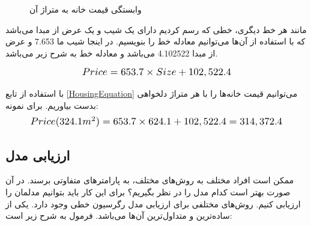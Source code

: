 \documentclass[a4paper, titlepage]{article}
\begin{document}
\begin{figure}[!htp]
\centering
{}
\caption{وابستگی قیمت خانه به متراژ آن}
\label{HousePrices}
\end{figure}

مانند هر خط دیگری، خطی که رسم کردیم دارای یک شیب و یک عرض از مبدا می‌باشد که با استفاده از آن‌ها می‌توانیم معادله خط را بنویسیم. در اینجا شیب ما 7.653 و عرض از مبدا 4.102522 می‌باشد و معادله خط به شرح زیر می‌باشد.

\begin{equation}
    \scalebox{1.2}{$Price = 653.7 \times Size + 102,522.4$}
    \label{HousingEquation}
\end{equation}

با استفاده از تابع \ref{HousingEquation} می‌توانیم قیمت خانه‌ها را با هر متراژ دلخواهی بدست بیاوریم. برای نمونه:
\begin{equation}
    \scalebox{1.2}{$Price(324.1m^2) = 653.7 \times 624.1 + 102,522.4 = 314,372.4$}
    \label{HousingExample}
\end{equation}

\subsection{ارزیابی مدل}
ممکن است افراد مختلف به روش‌های مختلف، به پارامتر‌های متفاوتی برسند. در آن صورت بهتر است کدام مدل را در نظر بگیریم؟ برای این کار باید بتوانیم مدلمان را ارزیابی کنیم. روش‌های مختلفی برای ارزیابی مدل رگرسیون خطی وجود دارد. یکی از ساده‌ترین و متداول‌ترین آن‌ها  می‌باشد. فرمول  به شرح زیر است:
\end{document}
